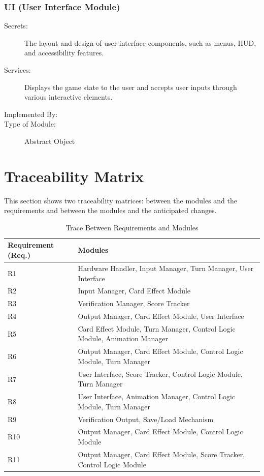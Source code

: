 \documentclass[12pt, titlepage]{article}
\begin{document}
\subsubsection{UI (User Interface Module)}

\begin{description}
\item[Secrets:] The layout and design of user interface components, such as menus, HUD, and accessibility features.
\item[Services:] Displays the game state to the user and accepts user inputs through various interactive elements.
\item[Implemented By:] \progname{}
\item[Type of Module:] Abstract Object
\end{description}



\section{Traceability Matrix} \label{SecTM}

This section shows two traceability matrices: between the modules and the
requirements and between the modules and the anticipated changes.

\begin{table}[H]
\centering
\begin{tabular}{p{} p{}}
\toprule
\textbf{Requirement (Req.)} & \textbf{Modules}\\
\midrule
R1 & Hardware Handler, Input Manager, Turn Manager, User Interface\\
R2 & Input Manager, Card Effect Module\\
R3 & Verification Manager, Score Tracker\\
R4 & Output Manager, Card Effect Module, User Interface\\
R5 & Card Effect Module, Turn Manager, Control Logic Module, Animation Manager\\
R6 & Output Manager, Card Effect Module, Control Logic Module, Turn Manager\\
R7 & User Interface, Score Tracker, Control Logic Module, Turn Manager\\
R8 & User Interface, Animation Manager, Control Logic Module, Turn Manager\\
R9 & Verification Output, Save/Load Mechanism\\
R10 & Output Manager, Card Effect Module, Control Logic Module\\
R11 & Output Manager, Card Effect Module, Score Tracker, Control Logic Module\\
\bottomrule
\end{tabular}
\caption{Trace Between Requirements and Modules}
\label{TblRT}
\end{table}
\end{document}

